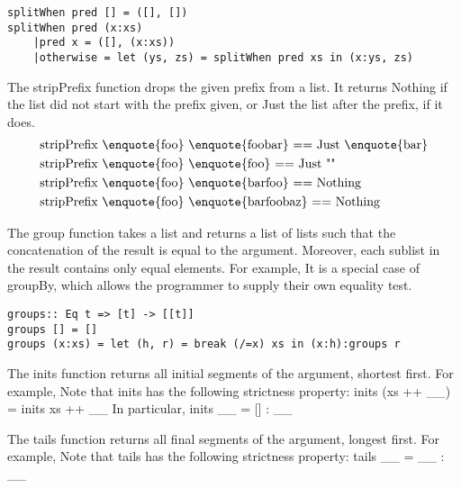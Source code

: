 \eqCode
\begin{lstlisting}[frame=single]
splitWhen pred [] = ([], [])
splitWhen pred (x:xs)
	|pred x = ([], (x:xs))
	|otherwise = let (ys, zs) = splitWhen pred xs in (x:ys, zs)
\end{lstlisting}

The stripPrefix function drops the given prefix from a list. It returns Nothing if the list did not start with the prefix given, or Just the list after the prefix, if it does.
\begin{align*}
	&\text{stripPrefix \enquote{foo} \enquote{foobar} == Just \enquote{bar}}\\
	&\text{stripPrefix \enquote{foo} \enquote{foo} == Just ""}\\
	&\text{stripPrefix \enquote{foo} \enquote{barfoo} == Nothing}\\
	&\text{stripPrefix \enquote{foo} \enquote{barfoobaz} == Nothing}
\end{align*}

The group function takes a list and returns a list of lists such that the concatenation of the result is equal to the argument. Moreover, each sublist in the result contains only equal elements. For example,
It is a special case of groupBy, which allows the programmer to supply their own equality test.

\eqCode
\label{haskellBreak}
\begin{lstlisting}[frame=single]
groups:: Eq t => [t] -> [[t]]
groups [] = []
groups (x:xs) = let (h, r) = break (/=x) xs in (x:h):groups r
\end{lstlisting}

The inits function returns all initial segments of the argument, shortest first. For example,
Note that inits has the following strictness property: inits (xs ++ \_\textbar\_) = inits xs ++ \_\textbar\_
In particular, inits \_\textbar\_ = [] : \_\textbar\_

The tails function returns all final segments of the argument, longest first. For example,
Note that tails has the following strictness property: tails \_\textbar\_ = \_\textbar\_ : \_\textbar\_

